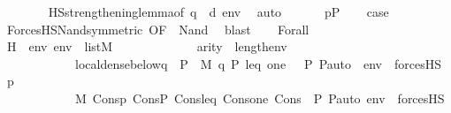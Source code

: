 \begin{isabellebody}
\ \ \ \ \ \ \isamarkupfalse%
\ HS{\isacharunderscore}{\kern0pt}strengthening{\isacharunderscore}{\kern0pt}lemma{\isacharbrackleft}{\kern0pt}of\ q\ {\isasympsi}\ d\ env{\isacharbrackright}{\kern0pt}\ \isamarkupfalse%
\ auto\isanewline
\ \ \isacommand{{\isacharbraceright}{\kern0pt}}\isamarkupfalse%
\isanewline
\ \ \isamarkupfalse%
\ {\isacartoucheopen}p{\isasymin}P{\isacartoucheclose}\isanewline
\ \ \isamarkupfalse%
\ {\isacharquery}{\kern0pt}case\isanewline
\ \ \ \ \isamarkupfalse%
\ ForcesHS{\isacharunderscore}{\kern0pt}Nand{\isacharbrackleft}{\kern0pt}symmetric{\isacharcomma}{\kern0pt}\ OF\ {\isacharunderscore}{\kern0pt}\ Nand{\isacharparenleft}{\kern0pt}{}{\isacharcomma}{\kern0pt}{}{\isacharcomma}{\kern0pt}{}{\isacharparenright}{\kern0pt}{\isacharbrackright}{\kern0pt}\ \isamarkupfalse%
\ blast\isanewline
{}\isamarkupfalse%
\isanewline
\ \ \isamarkupfalse%
\ {\isacharparenleft}{\kern0pt}Forall\ {\isasymphi}{\isacharparenright}{\kern0pt}\isanewline
\isanewline
\ \ \isamarkupfalse%
\ \isamarkupfalse%
\ H\ {\isacharcolon}{\kern0pt}\ {\isachardoublequoteopen}{\isasymAnd}env{\isachardot}{\kern0pt}\ env\ {\isasymin}\ list{\isacharparenleft}{\kern0pt}M{\isacharparenright}{\kern0pt}\ {\isasymLongrightarrow}\isanewline
\ \ \ \ \ \ \ \ \ \ \ \ arity{\isacharparenleft}{\kern0pt}{\isasymphi}{\isacharparenright}{\kern0pt}\ {\isasymle}\ length{\isacharparenleft}{\kern0pt}env{\isacharparenright}{\kern0pt}\ {\isasymLongrightarrow}\isanewline
\ \ \ \ \ \ \ \ \ \ \ \ local{\isachardot}{\kern0pt}dense{\isacharunderscore}{\kern0pt}below{\isacharparenleft}{\kern0pt}{\isacharbraceleft}{\kern0pt}q\ {\isasymin}\ P\ {\isachardot}{\kern0pt}\ M{\isacharcomma}{\kern0pt}\ {\isacharbrackleft}{\kern0pt}q{\isacharcomma}{\kern0pt}\ P{\isacharcomma}{\kern0pt}\ leq{\isacharcomma}{\kern0pt}\ one{\isacharcomma}{\kern0pt}\ {\isasymlangle}{\isasymF}{\isacharcomma}{\kern0pt}\ {\isasymG}{\isacharcomma}{\kern0pt}\ P{\isacharcomma}{\kern0pt}\ P{\isacharunderscore}{\kern0pt}auto{\isasymrangle}{\isacharbrackright}{\kern0pt}\ {\isacharat}{\kern0pt}\ env\ {\isasymTurnstile}\ forcesHS{\isacharparenleft}{\kern0pt}{\isasymphi}{\isacharparenright}{\kern0pt}{\isacharbraceright}{\kern0pt}{\isacharcomma}{\kern0pt}\ p{\isacharparenright}{\kern0pt}\ {\isasymLongrightarrow}\isanewline
\ \ \ \ \ \ \ \ \ \ \ \ M{\isacharcomma}{\kern0pt}\ Cons{\isacharparenleft}{\kern0pt}p{\isacharcomma}{\kern0pt}\ Cons{\isacharparenleft}{\kern0pt}P{\isacharcomma}{\kern0pt}\ Cons{\isacharparenleft}{\kern0pt}leq{\isacharcomma}{\kern0pt}\ Cons{\isacharparenleft}{\kern0pt}one{\isacharcomma}{\kern0pt}\ Cons{\isacharparenleft}{\kern0pt}{\isasymlangle}{\isasymF}{\isacharcomma}{\kern0pt}\ {\isasymG}{\isacharcomma}{\kern0pt}\ P{\isacharcomma}{\kern0pt}\ P{\isacharunderscore}{\kern0pt}auto{\isasymrangle}{\isacharcomma}{\kern0pt}\ env{\isacharparenright}{\kern0pt}{\isacharparenright}{\kern0pt}{\isacharparenright}{\kern0pt}{\isacharparenright}{\kern0pt}{\isacharparenright}{\kern0pt}\ {\isasymTurnstile}\ forcesHS{\isacharparenleft}{\kern0pt}{\isasymphi}{\isacharparenright}{\kern0pt}{\isachardoublequoteclose}\ \isamarkupfalse%

\end{isabellebody}
